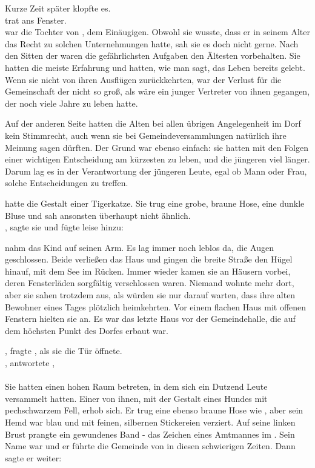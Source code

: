 \begin{Large}
Kurze Zeit später klopfte es.\\
{\Bomar} trat ans Fenster. \\
{\Mena} war die Tochter von {\Eno}, dem Einäugigen. Obwohl sie wusste, dass er in seinem Alter das Recht zu solchen Unternehmungen hatte, sah sie es doch nicht gerne. Nach den Sitten der {\Schattenlaufer} waren die gefährlichsten Aufgaben den Ältesten vorbehalten. Sie hatten die meiste Erfahrung und hatten, wie man sagt, das Leben bereits gelebt. Wenn sie nicht von ihren Ausflügen zurückkehrten, war der Verlust für die Gemeinschaft der {\Schattenlaufer} nicht so groß, als wäre ein junger Vertreter von ihnen gegangen, der noch viele Jahre zu leben hatte. 

Auf der anderen Seite hatten die Alten bei allen übrigen Angelegenheit im Dorf kein Stimmrecht, auch wenn sie bei Gemeindeversammlungen natürlich ihre Meinung sagen dürften. Der Grund war ebenso einfach: sie hatten mit den Folgen einer wichtigen Entscheidung am kürzesten zu leben, und die jüngeren viel länger. Darum lag es in der Verantwortung der jüngeren Leute, egal ob Mann oder Frau, solche Entscheidungen zu treffen.

{\Mena} hatte die Gestalt einer Tigerkatze. Sie trug eine grobe, braune Hose, eine dunkle Bluse und sah {\Nox} ansonsten überhaupt nicht ähnlich.\\
, sagte sie und fügte leise hinzu: 

{\Eno} nahm das Kind auf seinen Arm. Es lag immer noch leblos da, die Augen geschlossen.
Beide verließen das Haus und gingen die breite Straße den Hügel hinauf, mit dem See im Rücken. 
Immer wieder kamen sie an Häusern vorbei, deren Fensterläden sorgfältig verschlossen waren. Niemand wohnte mehr dort, aber sie sahen trotzdem aus, als würden sie nur darauf warten, dass ihre alten Bewohner eines Tages plötzlich heimkehrten. Vor einem flachen Haus mit offenen Fenstern hielten sie an. Es war das letzte Haus vor der Gemeindehalle, die auf dem höchsten Punkt des Dorfes erbaut war.

, fragte {\Mena}, als sie die Tür öffnete.\\
, antwortete {\Eno}, \\
\\
Sie hatten einen hohen Raum betreten, in dem sich ein Dutzend Leute versammelt hatten. Einer von ihnen, mit der Gestalt eines Hundes mit pechschwarzem Fell, erhob sich. Er trug eine ebenso braune Hose wie {\Mena}, aber sein Hemd war blau und mit feinen, silbernen Stickereien verziert. Auf seine linken Brust prangte ein gewundenes Band - das Zeichen eines Amtmannes im {\Enland}. Sein Name war {\Nox} und er führte die Gemeinde von {\Berna} in diesen schwierigen Zeiten. Dann sagte er weiter: 


\end{Large}

